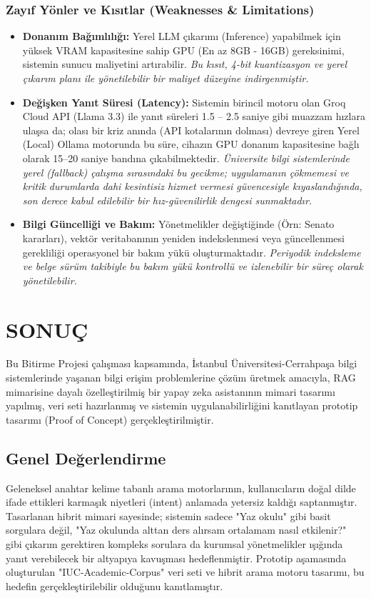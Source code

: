 \documentclass[12pt,a4paper]{report}
\begin{document}
\subsection{Zayıf Yönler ve Kısıtlar (Weaknesses \& Limitations)}
\begin{itemize}
    \item \textbf{Donanım Bağımlılığı:} Yerel LLM çıkarımı (Inference) yapabilmek için yüksek VRAM kapasitesine sahip GPU (En az 8GB - 16GB) gereksinimi, sistemin sunucu maliyetini artırabilir. \textit{Bu kısıt, 4-bit kuantizasyon ve yerel çıkarım planı ile yönetilebilir bir maliyet düzeyine indirgenmiştir.}
    \item \textbf{Değişken Yanıt Süresi (Latency):} Sistemin birincil motoru olan Groq Cloud API (Llama 3.3) ile yanıt süreleri 1.5 -- 2.5 saniye gibi muazzam hızlara ulaşsa da; olası bir kriz anında (API kotalarının dolması) devreye giren Yerel (Local) Ollama motorunda bu süre, cihazın GPU donanım kapasitesine bağlı olarak 15--20 saniye bandına çıkabilmektedir. \textit{Üniversite bilgi sistemlerinde yerel (fallback) çalışma sırasındaki bu gecikme; uygulamanın çökmemesi ve kritik durumlarda dahi kesintisiz hizmet vermesi güvencesiyle kıyaslandığında, son derece kabul edilebilir bir hız-güvenilirlik dengesi sunmaktadır.}
    \item \textbf{Bilgi Güncelliği ve Bakım:} Yönetmelikler değiştiğinde (Örn: Senato kararları), vektör veritabanının yeniden indekslenmesi veya güncellenmesi gerekliliği operasyonel bir bakım yükü oluşturmaktadır. \textit{Periyodik indeksleme ve belge sürüm takibiyle bu bakım yükü kontrollü ve izlenebilir bir süreç olarak yönetilebilir.}
\end{itemize}

\chapter{SONUÇ}

Bu Bitirme Projesi çalışması kapsamında, İstanbul Üniversitesi-Cerrahpaşa bilgi sistemlerinde yaşanan bilgi erişim problemlerine çözüm üretmek amacıyla, RAG mimarisine dayalı özelleştirilmiş bir yapay zeka asistanının mimari tasarımı yapılmış, veri seti hazırlanmış ve sistemin uygulanabilirliğini kanıtlayan prototip tasarımı (Proof of Concept) gerçekleştirilmiştir.

\section{Genel Değerlendirme}
Geleneksel anahtar kelime tabanlı arama motorlarının, kullanıcıların doğal dilde ifade ettikleri karmaşık niyetleri (intent) anlamada yetersiz kaldığı saptanmıştır. Tasarlanan hibrit mimari sayesinde; sistemin sadece "Yaz okulu" gibi basit sorgulara değil, "Yaz okulunda alttan ders alırsam ortalamam nasıl etkilenir?" gibi çıkarım gerektiren kompleks sorulara da kurumsal yönetmelikler ışığında yanıt verebilecek bir altyapıya kavuşması hedeflenmiştir. Prototip aşamasında oluşturulan "IUC-Academic-Corpus" veri seti ve hibrit arama motoru tasarımı, bu hedefin gerçekleştirilebilir olduğunu kanıtlamıştır.
\end{document}
